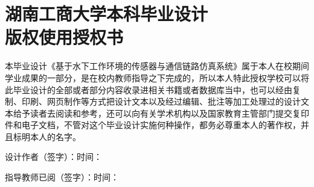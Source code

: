 
\chapter*{湖南工商大学本科毕业设计\protect\\版权使用授权书}

本毕业设计《基于水下工作环境的传感器与通信链路仿真系统》属于本人在校期间学业成果的一部分，是在校内教师指导之下完成的，所以本人特此授权学校可以将此毕业设计的全部或者部分内容收录进相关书籍或者数据库当中，也可以经由复制、印刷、网页制作等方式把设计文本以及经过编辑、批注等加工处理过的设计文本给予读者去阅读和参考，还可以向有关学术机构以及国家教育主管部门提交复印件和电子文档，不管对这个毕业设计实施何种操作，都务必尊重本人的著作权，并且标明本人的名字。

\vspace{70pt}
\noindent 设计作者（签字）：\underline{\hspace{3cm}}\hfill 时间：\underline{\hspace{3cm}}

\vspace{45pt}
\noindent 指导教师已阅（签字）：\underline{\hspace{3cm}}\hfill 时间：\underline{\hspace{3cm}}
